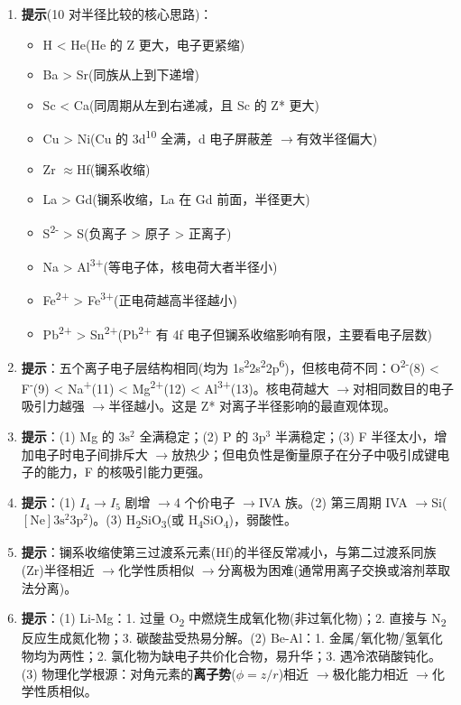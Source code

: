 \documentclass[a4paper,11pt]{ctexart}
\providecommand{\tightlist}{\setlength{\itemsep}{0pt}\setlength{\parskip}{0pt}}
\newcommand{\箭}{\ensuremath{\rightarrow}}
\newcommand{\左箭}{\ensuremath{\leftarrow}}
\newcommand{\上箭}{\ensuremath{\uparrow}}
\newcommand{\下箭}{\ensuremath{\downarrow}}
\newcommand{\衡}{\ensuremath{\rightleftharpoons}}
\newcommand{\双箭}{\ensuremath{\leftrightarrow}}
\newcommand{\约等于}{\ensuremath{\approx}}
\newcommand{\小于等于}{\ensuremath{\leq}}
\newcommand{\大于等于}{\ensuremath{\geq}}
\newcommand{\不等于}{\ensuremath{\neq}}
\newcommand{\西格马}{\ensuremath{\sigma}}
\newcommand{\派}{\ensuremath{\pi}}
\begin{document}
\begin{enumerate}
\def\labelenumi{\arabic{enumi}.}
\setcounter{enumi}{4}
\item
  \textbf{提示}(10 对半径比较的核心思路)：

  \begin{itemize}
  \tightlist
  \item
    H \textless{} He(He 的 Z 更大，电子更紧缩)
  \item
    Ba \textgreater{} Sr(同族从上到下递增)
  \item
    Sc \textless{} Ca(同周期从左到右递减，且 Sc 的 Z* 更大)
  \item
    Cu \textgreater{} Ni(Cu 的 3d\textsuperscript{10} 全满，d 电子屏蔽差 \箭 有效半径偏大)
  \item
    Zr \约等于 Hf(镧系收缩)
  \item
    La \textgreater{} Gd(镧系收缩，La 在 Gd 前面，半径更大)
  \item
    S\textsuperscript{2-} \textgreater{} S(负离子 \textgreater{} 原子 \textgreater{} 正离子)
  \item
    Na \textgreater{} Al\textsuperscript{3+}(等电子体，核电荷大者半径小)
  \item
    Fe\textsuperscript{2+} \textgreater{} Fe\textsuperscript{3+}(正电荷越高半径越小)
  \item
    Pb\textsuperscript{2+} \textgreater{} Sn\textsuperscript{2+}(Pb\textsuperscript{2+} 有 4f 电子但镧系收缩影响有限，主要看电子层数)
  \end{itemize}
\item
  \textbf{提示}：五个离子电子层结构相同(均为 1s\textsuperscript{2}2s\textsuperscript{2}2p\textsuperscript{6})，但核电荷不同：O\textsuperscript{2-}(8) \textless{} F\textsuperscript{-}(9) \textless{} Na\textsuperscript{+}(11) \textless{} Mg\textsuperscript{2+}(12) \textless{} Al\textsuperscript{3+}(13)。核电荷越大 \箭 对相同数目的电子吸引力越强 \箭 半径越小。这是 Z* 对离子半径影响的最直观体现。
\item
  \textbf{提示}：(1) Mg 的 \(3\mathrm{s}^2\) 全满稳定；(2) P 的 \(3\mathrm{p}^3\) 半满稳定；(3) F 半径太小，增加电子时电子间排斥大 \箭 放热少；但电负性是衡量原子在分子中吸引成键电子的能力，F 的核吸引能力更强。
\item
  \textbf{提示}：(1) \(I_4\to I_5\) 剧增 \箭 4 个价电子 \箭 IVA 族。(2) 第三周期 IVA \箭 Si(\([\mathrm{Ne}] 3\mathrm{s}^2 3\mathrm{p}^2\))。(3) H\textsubscript{2}SiO\textsubscript{3}(或 H\textsubscript{4}SiO\textsubscript{4})，弱酸性。
\item
  \textbf{提示}：镧系收缩使第三过渡系元素(Hf)的半径反常减小，与第二过渡系同族(Zr)半径相近 \箭 化学性质相似 \箭 分离极为困难(通常用离子交换或溶剂萃取法分离)。
\item
  \textbf{提示}：(1) Li-Mg：1. 过量 O\textsubscript{2} 中燃烧生成氧化物(非过氧化物)；2. 直接与 N\textsubscript{2} 反应生成氮化物；3. 碳酸盐受热易分解。(2) Be-Al：1. 金属/氧化物/氢氧化物均为两性；2. 氯化物为缺电子共价化合物，易升华；3. 遇冷浓硝酸钝化。(3) 物理化学根源：对角元素的\textbf{离子势}(\(\phi = z/r\))相近 \箭 极化能力相近 \箭 化学性质相似。
\end{enumerate}
\end{document}
